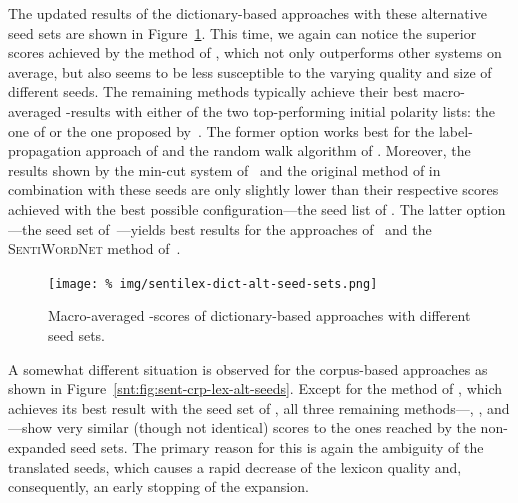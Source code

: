 The updated results of the dictionary-based approaches with these
alternative seed sets are shown in
Figure~\ref{snt:fig:sent-dict-lex-alt-seeds}.  This time, we again can
notice the superior scores achieved by the method of
\citet{Blair-Goldensohn:08}, which not only outperforms other systems
on average, but also seems to be less susceptible to the varying
quality and size of different seeds.  The remaining methods typically
achieve their best macro-averaged \F{}-results with either of the two
top-performing initial polarity lists: the one of \citet{Kim:04} or
the one proposed by~\citet{Esuli:06c}.  The former option works best
for the label-propagation approach of \citet{Rao:09} and the random
walk algorithm of \citet{Awadallah:10}.  Moreover, the results shown
by the min-cut system of~\citet{Rao:09} and the original method of
\citet{Kim:04} in combination with these seeds are only slightly lower
than their respective scores achieved with the best possible
configuration---the seed list of \citet{Turney:02}.  The latter
option---the seed set of~\citet{Esuli:06c}---yields best results for
the approaches of~\citet{Hu:04} and the \textsc{SentiWordNet} method
of~\citet{Esuli:06c}.

\begin{figure}[hbtp]
  \centering
  \texttt{[image: \%
    img/sentilex-dict-alt-seed-sets.png]}
  \caption{Macro-averaged \F{}-scores of dictionary-based approaches
    with different seed sets.}\label{snt:fig:sent-dict-lex-alt-seeds}
\end{figure}

A somewhat different situation is observed for the corpus-based
approaches as shown in Figure~\ref{snt:fig:sent-crp-lex-alt-seeds}.
Except for the method of \citet{Takamura:05}, which achieves its best
result with the seed set of \citet{Hu:04}, all three remaining
methods---\citet{Velikovich:10}, \citet{Kiritchenko:14}, and
\citet{Severyn:15}---show very similar (though not identical) scores
to the ones reached by the non-expanded seed sets.  The primary reason
for this is again the ambiguity of the translated seeds, which causes
a rapid decrease of the lexicon quality and, consequently, an early
stopping of the expansion.

